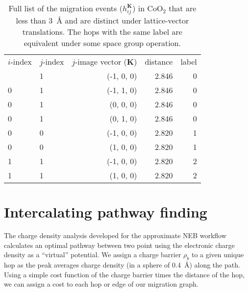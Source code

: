\documentclass[reprint,preprintnumbers,amsmath,amssymb,aps,prl]{revtex4-1}
\begin{document}
\begin{table}
    \caption{\label{tab:coo2_mg}%
        Full list of the migration events ($h_{ij}^{\mathbf{K}}$) in CoO$_2$ that are less than 3~\AA{} and are distinct under lattice-vector translations.
        The hops with the same label are equivalent under some space group operation.
    }
    \begin{ruledtabular}
        \begin{tabular}{llrrr}
            $i$-index & $j$-index & $j$-image vector ($\mathbf{K}$) & distance & label \\
            \colrule
            0         & 1        & (-1, 0, 0)                      & 2.846    & 0     \\
            0         & 1        & (-1, 1, 0)                      & 2.846    & 0     \\
            0         & 1        & (0, 0, 0)                       & 2.846    & 0     \\
            0         & 1        & (0, 1, 0)                  & 2.846    & 0     \\
            0         & 0        & (-1, 0, 0)                      & 2.820    & 1     \\
            0         & 0         & (1, 0, 0)                       & 2.820    & 1     \\
            1         & 1         & (-1, 0, 0)                      & 2.820    & 2     \\
            1         & 1         & (1, 0, 0)                       & 2.820    & 2     \\
        \end{tabular}
    \end{ruledtabular}
\end{table}

\clearpage

\section{Intercalating pathway finding}

The charge density analysis developed for the approximate NEB workflow~\cite{Rong2016Aug} calculates an optimal pathway between two point using the electronic charge density as a ``virtual'' potential.
We assign a charge barrier $\rho_{b}$ to a given unique hop as the peak averages charge density (in a sphere of 0.4~\AA) along the path.
Using a simple cost function of the charge barrier times the distance of the hop, we can assign a cost to each hop or edge of our migration graph.
\end{document}
